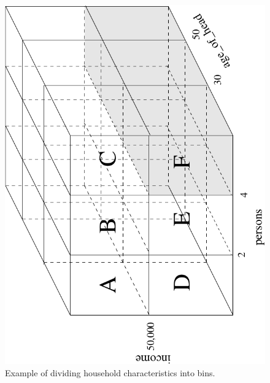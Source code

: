 \begin{figure}
\begin{center}
\includegraphics[scale=0.5, angle=-90]{images/htmexample.pdf}
\caption{\label{fig:htm-example}\small Example of dividing household
  characteristics into bins.}

\end{center}
\end{figure}
